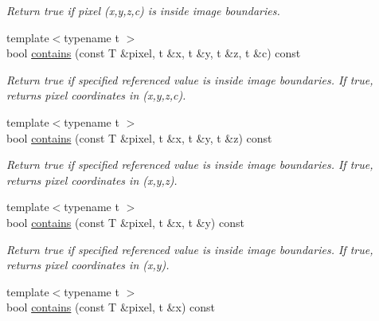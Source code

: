 \begin{DoxyCompactItemize}
\begin{DoxyCompactList}\small\item\em Return {\ttfamily true} if pixel (x,y,z,c) is inside image boundaries. \item\end{DoxyCompactList}\item 
\hypertarget{structcimg__library_1_1CImg_a45c06868be44aceeb7b52f4e97cab74d}{
{\footnotesize template$<$typename t $>$ }\\bool \hyperlink{structcimg__library_1_1CImg_a45c06868be44aceeb7b52f4e97cab74d}{contains} (const T \&pixel, t \&x, t \&y, t \&z, t \&c) const }
\label{structcimg__library_1_1CImg_a45c06868be44aceeb7b52f4e97cab74d}

\begin{DoxyCompactList}\small\item\em Return {\ttfamily true} if specified referenced value is inside image boundaries. If true, returns pixel coordinates in (x,y,z,c). \item\end{DoxyCompactList}\item 
\hypertarget{structcimg__library_1_1CImg_a4e1066d2e2e4be26b8ddb59c4e6ea6a2}{
{\footnotesize template$<$typename t $>$ }\\bool \hyperlink{structcimg__library_1_1CImg_a4e1066d2e2e4be26b8ddb59c4e6ea6a2}{contains} (const T \&pixel, t \&x, t \&y, t \&z) const }
\label{structcimg__library_1_1CImg_a4e1066d2e2e4be26b8ddb59c4e6ea6a2}

\begin{DoxyCompactList}\small\item\em Return {\ttfamily true} if specified referenced value is inside image boundaries. If true, returns pixel coordinates in (x,y,z). \item\end{DoxyCompactList}\item 
\hypertarget{structcimg__library_1_1CImg_aa55cfaf7d507c97343d750aa4c951ff3}{
{\footnotesize template$<$typename t $>$ }\\bool \hyperlink{structcimg__library_1_1CImg_aa55cfaf7d507c97343d750aa4c951ff3}{contains} (const T \&pixel, t \&x, t \&y) const }
\label{structcimg__library_1_1CImg_aa55cfaf7d507c97343d750aa4c951ff3}

\begin{DoxyCompactList}\small\item\em Return {\ttfamily true} if specified referenced value is inside image boundaries. If true, returns pixel coordinates in (x,y). \item\end{DoxyCompactList}\item 
\hypertarget{structcimg__library_1_1CImg_a0254f03aac63118f3fbc1ca3d9ede477}{
{\footnotesize template$<$typename t $>$ }\\bool \hyperlink{structcimg__library_1_1CImg_a0254f03aac63118f3fbc1ca3d9ede477}{contains} (const T \&pixel, t \&x) const }
\label{structcimg__library_1_1CImg_a0254f03aac63118f3fbc1ca3d9ede477}


\end{DoxyCompactItemize}
